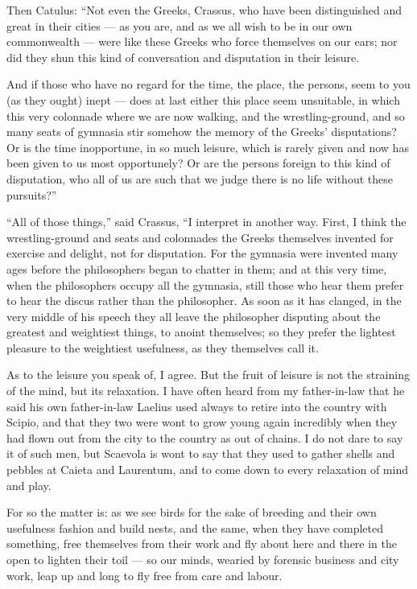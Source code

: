  Then Catulus: ``Not even the Greeks, Crassus, who have been distinguished and great in their cities — as you are, and as we all wish to be in our own commonwealth — were like these Greeks who force themselves on our ears; nor did they shun this kind of conversation and disputation in their leisure.

 And if those who have no regard for the time, the place, the persons, seem to you (as they ought) inept — does at last either this place seem unsuitable, in which this very colonnade where we are now walking, and the wrestling-ground, and so many seats of gymnasia stir somehow the memory of the Greeks' disputations? Or is the time inopportune, in so much leisure, which is rarely given and now has been given to us most opportunely? Or are the persons foreign to this kind of disputation, who all of us are such that we judge there is no life without these pursuits?''

 ``All of those things,'' said Crassus, ``I interpret in another way. First, I think the wrestling-ground and seats and colonnades the Greeks themselves invented for exercise and delight, not for disputation. For the gymnasia were invented many ages before the philosophers began to chatter in them; and at this very time, when the philosophers occupy all the gymnasia, still those who hear them prefer to hear the discus rather than the philosopher. As soon as it has clanged, in the very middle of his speech they all leave the philosopher disputing about the greatest and weightiest things, to anoint themselves; so they prefer the lightest pleasure to the weightiest usefulness, as they themselves call it.

 As to the leisure you speak of, I agree. But the fruit of leisure is not the straining of the mind, but its relaxation. I have often heard from my father-in-law that he said his own father-in-law Laelius used always to retire into the country with Scipio, and that they two were wont to grow young again incredibly when they had flown out from the city to the country as out of chains. I do not dare to say it of such men, but Scaevola is wont to say that they used to gather shells and pebbles at Caieta and Laurentum, and to come down to every relaxation of mind and play.

 For so the matter is: as we see birds for the sake of breeding and their own usefulness fashion and build nests, and the same, when they have completed something, free themselves from their work and fly about here and there in the open to lighten their toil — so our minds, wearied by forensic business and city work, leap up and long to fly free from care and labour.

